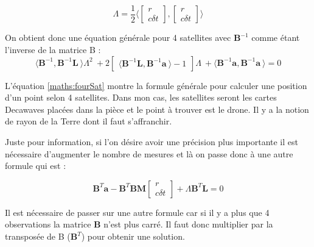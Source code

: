             \[ \Lambda = \frac{1}{2}
            \langle
                \begin{bmatrix}
                    r\\
                    c\delta t
                \end{bmatrix},
                \begin{bmatrix}
                    r\\
                    c\delta t
                \end{bmatrix}
            \rangle
            \]
            
            On obtient donc une équation générale pour 4 satellites avec $\mathbf{B}^{-1}$ comme étant l'inverse de la matrice B :
            \begin{equation}\label{maths:fourSat}
                \langle\mathbf{B}^{-1}, \mathbf{B}^{-1}\mathbf{L}~\rangle\Lambda^{2}~+
                2
                \begin{bmatrix}
                \langle\mathbf{B}^{-1}\mathbf{L}, \mathbf{B}^{-1}\mathbf{a}~\rangle - 1
                \end{bmatrix}
                \Lambda~+
                \langle\mathbf{B}^{-1}\mathbf{a}, \mathbf{B}^{-1}\mathbf{a}~\rangle
                = 0
            \end{equation}
            
            L'équation \ref{maths:fourSat} montre la formule générale pour calculer une position d'un point selon 4 satellites. Dans mon cas, les satellites seront les cartes Decawaves placées dans la pièce et le point à trouver est le drone. Il y a la notion de rayon de la Terre dont il faut s'affranchir.
            
            Juste pour information, si l'on désire avoir une précision plus importante il est nécessaire d'augmenter le nombre de mesures et là on passe donc à une autre formule qui est : 
            
            \begin{equation} \label{maths:nSat}
                \mathbf{B}^{T}\mathbf{a} - \mathbf{B}^{T}\mathbf{BM}
                \begin{bmatrix}
                r\\ c\delta t
                \end{bmatrix} + \Lambda\mathbf{B}^{T}\mathbf{L} = 0
            \end{equation}
            
            Il est nécessaire de passer sur une autre formule car si il y a plus que 4 observations la matrice $\mathbf{B}$ n'est plus carré. Il faut donc multiplier par la transposée de B ($\mathbf{B}^{T}$) pour obtenir une solution.
            
